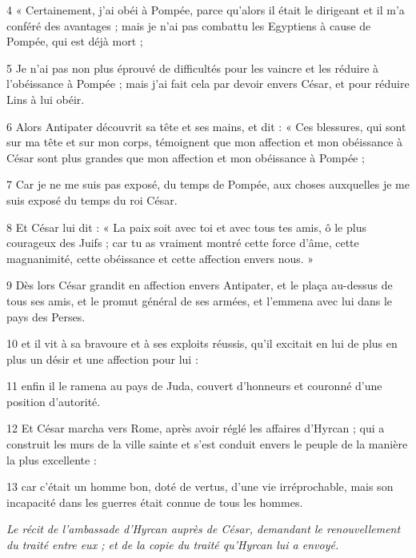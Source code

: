 \par 4 « Certainement, j'ai obéi à Pompée, parce qu'alors il était le dirigeant et il m'a conféré des avantages ; mais je n'ai pas combattu les Egyptiens à cause de Pompée, qui est déjà mort ;

\par 5 Je n'ai pas non plus éprouvé de difficultés pour les vaincre et les réduire à l'obéissance à Pompée ; mais j’ai fait cela par devoir envers César, et pour réduire Lins à lui obéir.

\par 6 Alors Antipater découvrit sa tête et ses mains, et dit : « Ces blessures, qui sont sur ma tête et sur mon corps, témoignent que mon affection et mon obéissance à César sont plus grandes que mon affection et mon obéissance à Pompée ;

\par 7 Car je ne me suis pas exposé, du temps de Pompée, aux choses auxquelles je me suis exposé du temps du roi César.

\par 8 Et César lui dit : « La paix soit avec toi et avec tous tes amis, ô le plus courageux des Juifs ; car tu as vraiment montré cette force d'âme, cette magnanimité, cette obéissance et cette affection envers nous. »

\par 9 Dès lors César grandit en affection envers Antipater, et le plaça au-dessus de tous ses amis, et le promut général de ses armées, et l'emmena avec lui dans le pays des Perses.

\par 10 et il vit à sa bravoure et à ses exploits réussis, qu'il excitait en lui de plus en plus un désir et une affection pour lui :

\par 11 enfin il le ramena au pays de Juda, couvert d'honneurs et couronné d'une position d'autorité.

\par 12 Et César marcha vers Rome, après avoir réglé les affaires d'Hyrcan ; qui a construit les murs de la ville sainte et s'est conduit envers le peuple de la manière la plus excellente :

\par 13 car c'était un homme bon, doté de vertus, d'une vie irréprochable, mais son incapacité dans les guerres était connue de tous les hommes.



\par \textit{Le récit de l'ambassade d'Hyrcan auprès de César, demandant le renouvellement du traité entre eux ; et de la copie du traité qu'Hyrcan lui a envoyé.}

